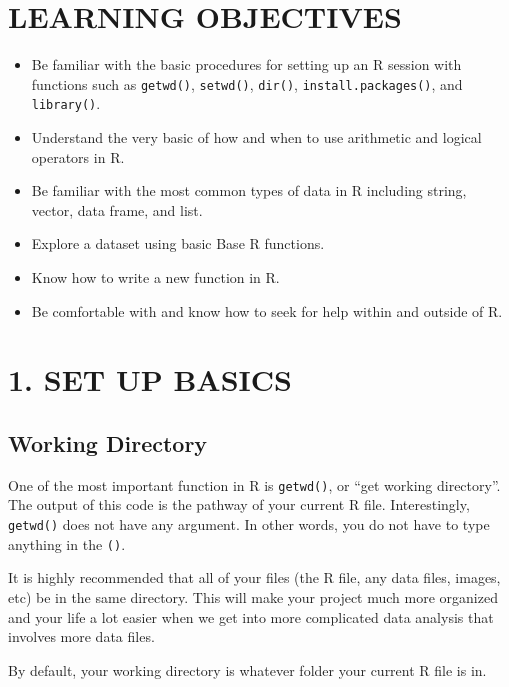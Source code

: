 \documentclass[
]{book}
\providecommand{\tightlist}{%
  \setlength{\itemsep}{0pt}\setlength{\parskip}{0pt}}
\begin{document}
\hypertarget{learning-objectives-1}{%
\section{LEARNING OBJECTIVES}\label{learning-objectives-1}}

\begin{itemize}
\tightlist
\item
  Be familiar with the basic procedures for setting up an R session with functions such as \texttt{getwd()}, \texttt{setwd()}, \texttt{dir()}, \texttt{install.packages()}, and \texttt{library()}.
\item
  Understand the very basic of how and when to use arithmetic and logical operators in R.
\item
  Be familiar with the most common types of data in R including string, vector, data frame, and list.
\item
  Explore a dataset using basic Base R functions.
\item
  Know how to write a new function in R.
\item
  Be comfortable with and know how to seek for help within and outside of R.
\end{itemize}

\hypertarget{set-up-basics}{%
\section{1. SET UP BASICS}\label{set-up-basics}}

\hypertarget{working-directory}{%
\subsection{Working Directory}\label{working-directory}}

One of the most important function in R is \texttt{getwd()}, or ``get working directory''. The output of this code is the pathway of your current R file. Interestingly, \texttt{getwd()} does not have any argument. In other words, you do not have to type anything in the \texttt{()}.

It is highly recommended that all of your files (the R file, any data files, images, etc) be in the same directory. This will make your project much more organized and your life a lot easier when we get into more complicated data analysis that involves more data files.

By default, your working directory is whatever folder your current R file is in.
\end{document}

